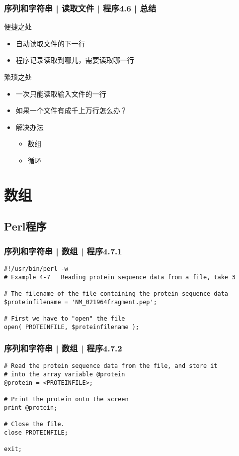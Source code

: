 \begin{frame}[fragile]
  \frametitle{序列和字符串 | 读取文件 | 程序4.6 | 总结}
  \begin{block}{便捷之处}
    \begin{itemize}
      \item 自动读取文件的下一行
      \item 程序记录读取到哪儿，需要读取哪一行
    \end{itemize}
  \end{block}
  \pause
  \begin{block}{繁琐之处}
    \begin{itemize}
      \item 一次只能读取输入文件的一行
      \item 如果一个文件有成千上万行怎么办？
      \item 解决办法
        \begin{itemize}
          \item 数组
          \item 循环
        \end{itemize}
    \end{itemize}
  \end{block}
\end{frame}

\section{数组}
\subsection{Perl程序}
\begin{frame}[fragile]
  \frametitle{序列和字符串 | 数组 | 程序4.7.1}
\begin{lstlisting}
#!/usr/bin/perl -w
# Example 4-7   Reading protein sequence data from a file, take 3

# The filename of the file containing the protein sequence data
$proteinfilename = 'NM_021964fragment.pep';

# First we have to "open" the file
open( PROTEINFILE, $proteinfilename );
\end{lstlisting}
\end{frame}

\begin{frame}[fragile]
  \frametitle{序列和字符串 | 数组 | 程序4.7.2}
\begin{lstlisting}[firstnumber=10]
# Read the protein sequence data from the file, and store it
# into the array variable @protein
@protein = <PROTEINFILE>;

# Print the protein onto the screen
print @protein;

# Close the file.
close PROTEINFILE;

exit;
\end{lstlisting}
\end{frame}

